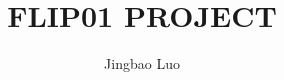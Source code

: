 \documentclass{amsart}
\begin{document}
%
%
\title[FLIP01 PROJECT]{FLIP01 PROJECT}%

\author{Jingbao Luo}
\address[A.~1]{School of Economics and Management,\\ 
Nanjing University of Science and Technology, Nanjing 210094, China}%

\date{\gitAuthorDate}%




\maketitle
\tableofcontents

\newpage



\end{document}
